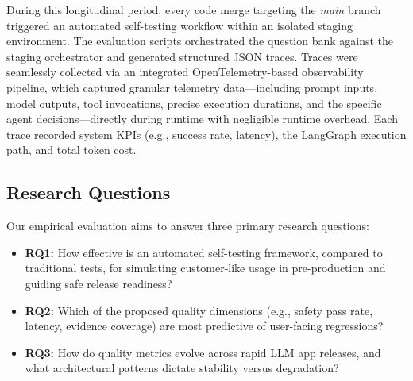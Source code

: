 During this longitudinal period, every code merge targeting the \textit{main} branch triggered an automated self-testing workflow within an isolated staging environment. The evaluation scripts orchestrated the question bank against the staging orchestrator and generated structured JSON traces. Traces were seamlessly collected via an integrated OpenTelemetry-based observability pipeline, which captured granular telemetry data—including prompt inputs, model outputs, tool invocations, precise execution durations, and the specific agent decisions—directly during runtime with negligible runtime overhead. Each trace recorded system KPIs (e.g., success rate, latency), the LangGraph execution path, and total token cost.

\subsection{Research Questions}
Our empirical evaluation aims to answer three primary research questions:
\begin{itemize}
    \item \textbf{RQ1:} How effective is an automated self-testing framework, compared to traditional tests, for simulating customer-like usage in pre-production and guiding safe release readiness?
    \item \textbf{RQ2:} Which of the proposed quality dimensions (e.g., safety pass rate, latency, evidence coverage) are most predictive of user-facing regressions?
    \item \textbf{RQ3:} How do quality metrics evolve across rapid LLM app releases, and what architectural patterns dictate stability versus degradation?
\end{itemize}
